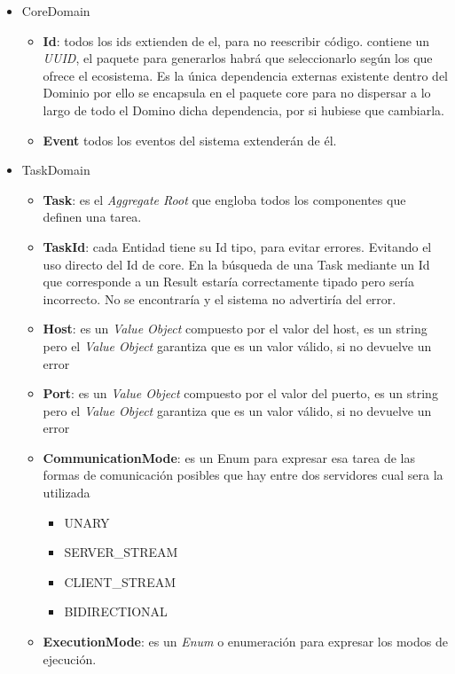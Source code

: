 \begin{itemize}
    \item CoreDomain
    \begin{itemize}
        \item \textbf{Id}: todos los ids extienden de el, para no reescribir código.
        contiene un \textit{UUID}, el paquete para generarlos habrá que seleccionarlo según los que ofrece el ecosistema.
        Es la única dependencia externas existente dentro del Dominio por ello se encapsula en el  paquete core para no dispersar a lo largo de todo el Domino dicha dependencia, por si hubiese que cambiarla.
        \item \textbf{Event} todos los eventos del sistema extenderán de él.
    \end{itemize}
    \item TaskDomain
    \begin{itemize}
        \item \textbf{Task}: es el \textit{Aggregate Root} que engloba todos los componentes que definen una tarea.
        \item \textbf{TaskId}: cada Entidad tiene su Id tipo, para evitar errores.
        Evitando el uso directo del Id de core.
        En la búsqueda de una Task mediante un Id que corresponde a un Result estaría correctamente tipado pero sería incorrecto.
        No se encontraría y el sistema no advertiría del error.
        \item \textbf{Host}: es un \textit{Value Object} compuesto por el valor del host, es un string pero el \textit{Value Object} garantiza que es un valor válido, si no devuelve un error
        \item \textbf{Port}: es un \textit{Value Object} compuesto por el valor del puerto, es un string pero el \textit{Value Object} garantiza que es un valor válido, si no devuelve un error
        \item \textbf{CommunicationMode}: es un Enum para expresar esa tarea de las formas de comunicación posibles que hay entre dos servidores cual sera la utilizada
        \begin{itemize}
            \item UNARY
            \item SERVER\_STREAM
            \item CLIENT\_STREAM
            \item BIDIRECTIONAL
        \end{itemize}
        \item \textbf{ExecutionMode}: es un \textit{Enum} o enumeración para expresar los modos de ejecución.

\end{itemize}
\end{itemize}
